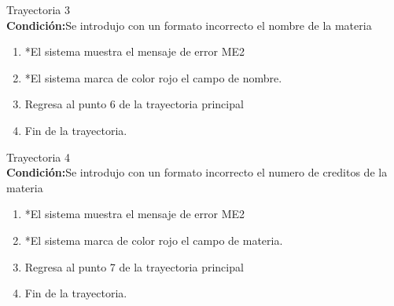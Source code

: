 \large{Trayectoria 3}\\
\textbf{Condición:}Se introdujo con un formato incorrecto el nombre de la materia
\begin{enumerate}
    \item *El sistema muestra el mensaje de error ME2
    \item *El sistema marca de color rojo el campo de nombre.
    \item Regresa al punto 6 de la trayectoria principal
    \item Fin de la trayectoria.
\end{enumerate}

\large{Trayectoria 4}\\
\textbf{Condición:}Se introdujo con un formato incorrecto el numero de creditos de la materia
\begin{enumerate}
    \item *El sistema muestra el mensaje de error ME2
    \item *El sistema marca de color rojo el campo de materia.
    \item Regresa al punto 7 de la trayectoria principal
    \item Fin de la trayectoria.
\end{enumerate}